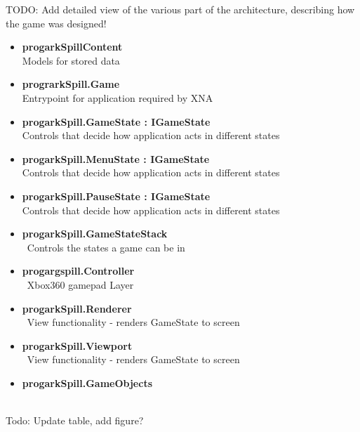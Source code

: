 

TODO: Add detailed view of the various part of the architecture, describing how the game was designed!

\begin{itemize}
	\item \textbf{progarkSpillContent} \\ Models for stored data
	\item \textbf{prograrkSpill.Game} \\ Entrypoint for application required by XNA
	\item \textbf{progarkSpill.GameState : IGameState} \\ Controls that decide how application acts in different states 
	\item \textbf{progarkSpill.MenuState : IGameState} \\ Controls that decide how application acts in different states 
	\item \textbf{progarkSpill.PauseState : IGameState} \\ Controls that decide how application acts in different states 
	\item \textbf{progarkSpill.GameStateStack} \\ Controls the states a game can be in		
	\item \textbf{progargspill.Controller} \\ Xbox360 gamepad Layer
	\item \textbf{progarkSpill.Renderer} \\ View functionality - renders GameState to screen 
	\item \textbf{progarkSpill.Viewport} \\ View functionality - renders GameState to screen
	\item \textbf{progarkSpill.GameObjects} \\ 
\end{itemize}

Todo: Update table, add figure?

